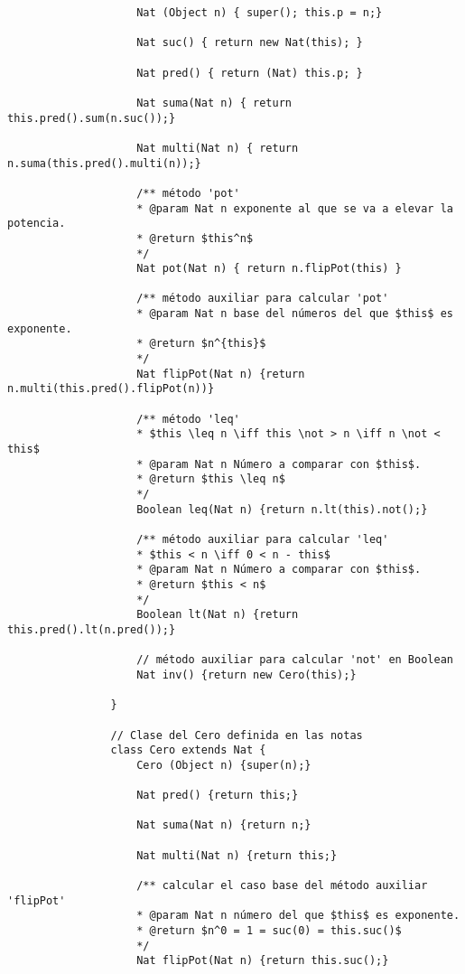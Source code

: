 \documentclass{article}
\begin{document}
\begin{enumerate}
\begin{enumerate}
\begin{verbatim}
                    Nat (Object n) { super(); this.p = n;}

                    Nat suc() { return new Nat(this); }

                    Nat pred() { return (Nat) this.p; }

                    Nat suma(Nat n) { return this.pred().sum(n.suc());}

                    Nat multi(Nat n) { return n.suma(this.pred().multi(n));}

                    /** método 'pot'
                    * @param Nat n exponente al que se va a elevar la potencia.
                    * @return $this^n$
                    */
                    Nat pot(Nat n) { return n.flipPot(this) }

                    /** método auxiliar para calcular 'pot'
                    * @param Nat n base del números del que $this$ es exponente.
                    * @return $n^{this}$
                    */
                    Nat flipPot(Nat n) {return n.multi(this.pred().flipPot(n))}

                    /** método 'leq'
                    * $this \leq n \iff this \not > n \iff n \not < this$
                    * @param Nat n Número a comparar con $this$.
                    * @return $this \leq n$
                    */
                    Boolean leq(Nat n) {return n.lt(this).not();}

                    /** método auxiliar para calcular 'leq'
                    * $this < n \iff 0 < n - this$
                    * @param Nat n Número a comparar con $this$.
                    * @return $this < n$
                    */
                    Boolean lt(Nat n) {return this.pred().lt(n.pred());}

                    // método auxiliar para calcular 'not' en Boolean
                    Nat inv() {return new Cero(this);}

                }

                // Clase del Cero definida en las notas
                class Cero extends Nat {
                    Cero (Object n) {super(n);}

                    Nat pred() {return this;}

                    Nat suma(Nat n) {return n;}

                    Nat multi(Nat n) {return this;}

                    /** calcular el caso base del método auxiliar 'flipPot'
                    * @param Nat n número del que $this$ es exponente.
                    * @return $n^0 = 1 = suc(0) = this.suc()$
                    */
                    Nat flipPot(Nat n) {return this.suc();}


\end{verbatim}
\end{enumerate}
\end{enumerate}
\end{document}
